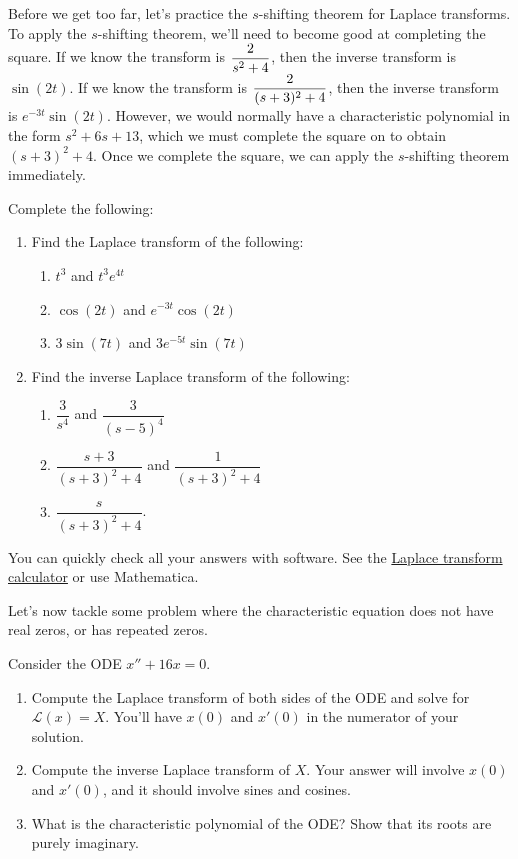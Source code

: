 Before we get too far, let's practice the $s$-shifting theorem for Laplace transforms.
To apply the $s$-shifting theorem, we'll need to become good at completing the square.  
If we know the transform is $\displaystyle\frac{2}{s^2+4}$, then the inverse transform is $\sin(2t)$. 
If we know the transform is $\displaystyle\frac{2}{(s+3)^2+4}$, then the inverse transform is $e^{-3t}\sin(2t)$. 
However, we would normally have a characteristic polynomial in the form $s^2+6s+13$, which we must complete the square on to obtain $(s+3)^2+4$. 
Once we complete the square, we can apply the $s$-shifting theorem immediately.
\begin{problem}
 Complete the following:
\begin{enumerate}
 \item Find the Laplace transform of the following:
\begin{enumerate}
 \item $t^3$ and $ t^3 e^{4t}$
 \item $\cos(2t)$ and $e^{-3t}\cos(2t)$
 \item $3\sin(7t)$ and $3e^{-5t}\sin(7t)$ 
\end{enumerate}
 \item Find the inverse Laplace transform of the following:
\begin{enumerate}
 \item $\dfrac{3}{s^4}$ and $\dfrac{3}{(s-5)^4}$
 \item $\dfrac{s+3}{(s+3)^2+4}$ and $\dfrac{1}{(s+3)^2+4}$
 \item $\dfrac{s}{(s+3)^2+4}$.
\end{enumerate}
\end{enumerate}
You can quickly check all your answers with software. See the \href{\urllaplacetransforms}{Laplace transform calculator} or use Mathematica. 
\end{problem}



Let's now tackle some problem where the characteristic equation does not have real zeros, or has repeated zeros. 
\begin{problem}
 Consider the ODE $x''+16x=0$. 
 \begin{enumerate}
 \item Compute the Laplace transform of both sides of the ODE and solve for $\mathscr{L}(x) = X$. You'll have $x(0)$ and $x'(0)$ in the numerator of your solution. 
 \item Compute the inverse Laplace transform of $X$. Your answer will involve $x(0)$ and $x'(0)$, and it should involve sines and cosines. 
 \item What is the characteristic polynomial of the ODE?  Show that its roots are purely imaginary.
\end{enumerate} 
\end{problem}

